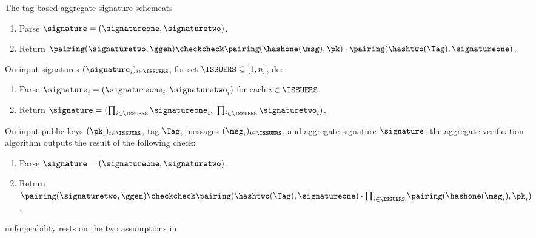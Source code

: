 \begin{protocolbox}{The tag-based aggregate signature scheme}{ats}
\begin{description}
      \begin{enumerate}

	\item Parse $\signature = (\signatureone, \signaturetwo)$.

	\item Return $\pairing(\signaturetwo,\ggen) \checkcheck
\pairing(\hashone(\msg), \pk) \cdot \pairing(\hashtwo(\Tag), \signatureone)$.

      \end{enumerate}

    \item[$\signature \leftarrow \ATSaggregate((\signature_i)_{i \in
\ISSUERS})$:] On input signatures $(\signature_i)_{i \in \ISSUERS}$, for set
$\ISSUERS \subseteq [1, n]$, do:

      \begin{enumerate}

	\item Parse $\signature_i = (\signatureone_i, \signaturetwo_i)$ for each
$i \in \ISSUERS$.

	\item Return $\signature = (\prod_{i\in\ISSUERS} \signatureone_i, \
\prod_{i\in\ISSUERS} \signaturetwo_i)$.

      \end{enumerate}

    \item[$\{0,1\} \leftarrow \ATSverifyagg((\pk_i)_{i\in \ISSUERS},
\Tag,(\msg_i)_{i\in \ISSUERS},\signature) $ :] On input public keys
$(\pk_i)_{i\in \ISSUERS}$, tag $\Tag$, messages $(\msg_i)_{i\in \ISSUERS}$, and
aggregate signature $\signature$, the aggregate verification algorithm outputs
the result of the following check:

      \begin{enumerate}

	\item Parse $\signature = (\signatureone, \signaturetwo)$.

	\item Return $\pairing(\signaturetwo, \ggen) \checkcheck \pairing
(\hashtwo(\Tag), \signatureone) \cdot \prod_{i\in\ISSUERS}
\pairing(\hashone(\msg_i), \pk_i)$.

      \end{enumerate}

  \end{description} \end{protocolbox}

\begin{outline}
  \item unforgeability rests on the two assumptions in 
\end{outline}

